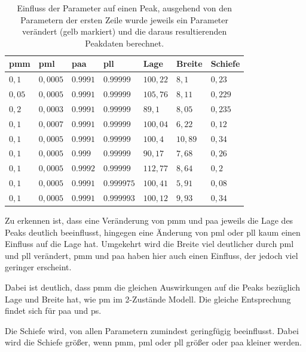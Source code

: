 \begin{table}[h]
\centering
\caption[Einfluss auf einen Peak (2)]{Einfluss der Parameter auf einen Peak, ausgehend von den Parametern der ersten Zeile wurde jeweils ein Parameter verändert (gelb markiert) und die daraus resultierenden Peakdaten berechnet.}
\label{einfluss_t100}
\begin{tabular}{|l|l|l|l||l|l|l|}
\hline
pmm & pml    & paa    & pll      & Lage  & Breite & Schiefe \\ \hline \hline
 $0,1$ & $0,0005$  & $0.9991$  & $0.99999$  & $100,22$  & $8,1$  & $0,23$ \\ \hline
\cellcolor{yellow} $0,05$ & $0,0005$  & $0.9991$  & $0.99999$  & $105,76$  & $8,11$  & $0,229$ \\ \hline
\cellcolor{yellow} $0,2$ & $0,0003$  & $0.9991$  & $0.99999$  & $89,1$  & $8,05$  & $0,235$ \\ \hline
 $0,1$ & \cellcolor{yellow} $0,0007$  & $0.9991$  & $0.99999$  & $100,04$  & $6,22$  & $0,12$ \\ \hline
 $0,1$ & \cellcolor{yellow} $0,0005$  & $0.9991$  & $0.99999$  & $100,4$  & $10,89$  & $0,34$ \\ \hline
 $0,1$ & $0,0005$  & \cellcolor{yellow} $0.999$  & $0.99999$  & $90,17$  & $7,68$  & $0,26$ \\ \hline
 $0,1$ & $0,0005$  & \cellcolor{yellow} $0.9992$  & $0.99999$  & $112,77$  & $8,64$  & $0,2$ \\ \hline
 $0,1$ & $0,0005$  & $0.9991$  & \cellcolor{yellow} $0.999975$  & $100,41$  & $5,91$  & $0,08$ \\ \hline
 $0,1$ & $0,0005$  & $0.9991$  & \cellcolor{yellow} $0.999993$  & $100,12$  & $9,93$  & $0,34$ \\ \hline
\end{tabular}
\end{table}

Zu erkennen ist, dass eine Veränderung von pmm und paa jeweils die Lage des Peaks deutlich beeinflusst, hingegen eine Änderung von pml oder pll kaum einen Einfluss auf die Lage hat. Umgekehrt wird die Breite viel deutlicher durch pml und pll verändert, pmm und paa haben hier auch einen Einfluss, der jedoch viel geringer erscheint. 

Dabei ist deutlich, dass pmm die gleichen Auswirkungen auf die Peaks bezüglich Lage und Breite hat, wie pm im 2-Zustände Modell. Die gleiche Entsprechung findet sich für paa und ps.

Die Schiefe wird, von allen Parametern zumindest geringfügig beeinflusst. Dabei wird die Schiefe größer, wenn pmm, pml oder pll größer oder paa kleiner werden.

